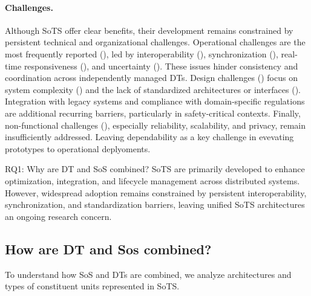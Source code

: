 \paragraph{Challenges.}\label{para:lt-rq1-challenges}

Although SoTS offer clear benefits, their development remains constrained by persistent technical and organizational challenges. Operational challenges are the most frequently reported (), led by interoperability (), synchronization (), real-time responsiveness (), and uncertainty (). These issues hinder consistency and coordination across independently managed DTs. Design challenges () focus on system complexity () and the lack of standardized architectures or interfaces (). Integration with legacy systems and compliance with domain-specific regulations are additional recurring barriers, particularly in safety-critical contexts. Finally, non-functional challenges (), especially reliability, scalability, and privacy, remain insufficiently addressed. Leaving dependability as a key challenge in evevating prototypes to operational deplyoments.

\vspace{1em}
\begin{conclusionframe}{RQ1: Why are DT and SoS combined?}
SoTS are primarily developed to enhance optimization, integration, and lifecycle management across distributed systems. However, widespread adoption remains constrained by persistent interoperability, synchronization, and standardization barriers, leaving unified SoTS architectures an ongoing research concern.
\end{conclusionframe}



\subsection{How are DT and Sos combined?}\label{subsec:literature-review-results-rq2}%
To understand how SoS and DTs are combined, we analyze architectures and types of constituent units represented in SoTS.


